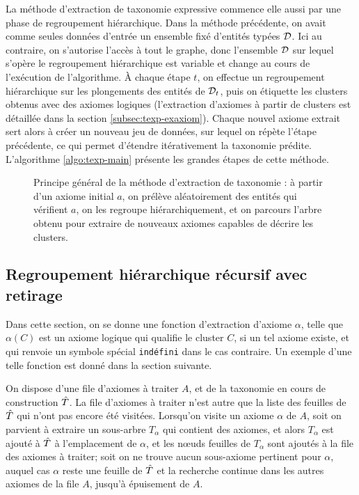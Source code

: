 La méthode d'extraction de taxonomie expressive commence elle aussi par une phase de regroupement hiérarchique. Dans la méthode précédente, on avait comme seules données d'entrée un ensemble fixé d'entités typées $\cal{D}$. Ici au contraire, on s'autorise l'accès à tout le graphe, donc l'ensemble $\cal{D}$ sur lequel s'opère le regroupement hiérarchique est variable et change au cours de l'exécution de l'algorithme. À chaque étape $t$, on effectue un regroupement hiérarchique sur les plongements des entités de $\cal{D}_t$, puis on étiquette les clusters obtenus avec des axiomes logiques (l'extraction d'axiomes à partir de clusters est détaillée dans la section \ref{subsec:texp-exaxiom}). Chaque nouvel axiome extrait sert alors à créer un nouveau jeu de données, sur lequel on répète l'étape précédente, ce qui permet d'étendre itérativement la taxonomie prédite. L'algorithme \ref{algo:texp-main} présente les grandes étapes de cette méthode.

\begin{figure}[h]
    \centering
    
    \caption[Aperçu de la méthode d'extraction de taxonomie expressive]{Principe général de la méthode d'extraction de taxonomie : à partir d'un axiome initial $a$, on prélève aléatoirement des entités qui vérifient $a$, on les regroupe hiérarchiquement, et on parcours l'arbre obtenu pour extraire de nouveaux axiomes capables de décrire les clusters.}
    \label{fig:texp-overview}
\end{figure}


\subsection{Regroupement hiérarchique récursif avec retirage}




Dans cette section, on se donne une fonction d'extraction d'axiome $\alpha$, telle que $\alpha(C)$ est un axiome logique qui qualifie le cluster $C$, si un tel axiome existe, et qui renvoie un symbole spécial \texttt{indéfini} dans le cas contraire. Un exemple d'une telle fonction est donné dans la section suivante. 

On dispose d'une file d'axiomes à traiter $A$, et de la taxonomie en cours de construction $\Tpred$. La file d'axiomes à traiter n'est autre que la liste des feuilles de $\Tpred$ qui n'ont pas encore été visitées. Lorsqu'on visite un axiome $\alpha$ de $A$, soit on parvient à extraire un sous-arbre $T_\alpha$ qui contient des axiomes, et alors $T_\alpha$ est ajouté à $\Tpred$ à l'emplacement de $\alpha$, et les nœuds feuilles de $T_\alpha$ sont ajoutés à la file des axiomes à traiter; soit on ne trouve aucun sous-axiome pertinent pour $\alpha$, auquel cas $\alpha$ reste une feuille de $\Tpred$ et la recherche continue dans les autres axiomes de la file $A$, jusqu'à épuisement de $A$.

